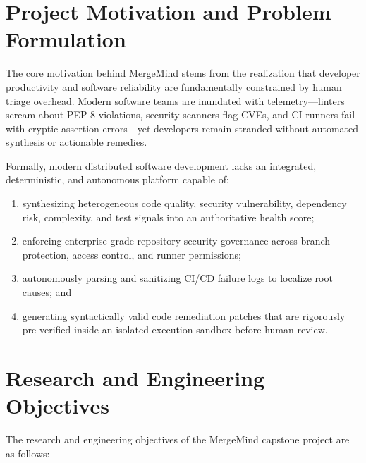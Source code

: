 \section{Project Motivation and Problem Formulation}
\label{sec:motivation}

The core motivation behind MergeMind stems from the realization that developer productivity and software reliability are fundamentally constrained by human triage overhead. Modern software teams are inundated with telemetry---linters scream about PEP 8 violations, security scanners flag CVEs, and CI runners fail with cryptic assertion errors---yet developers remain stranded without automated synthesis or actionable remedies.

Formally, modern distributed software development lacks an integrated, deterministic, and autonomous platform capable of:
\begin{enumerate}[label=(\alph*)]
    \item synthesizing heterogeneous code quality, security vulnerability, dependency risk, complexity, and test signals into an authoritative health score;
    \item enforcing enterprise-grade repository security governance across branch protection, access control, and runner permissions;
    \item autonomously parsing and sanitizing CI/CD failure logs to localize root causes; and
    \item generating syntactically valid code remediation patches that are rigorously pre-verified inside an isolated execution sandbox before human review.
\end{enumerate}

\section{Research and Engineering Objectives}
\label{sec:objectives}

The research and engineering objectives of the MergeMind capstone project are as follows:

